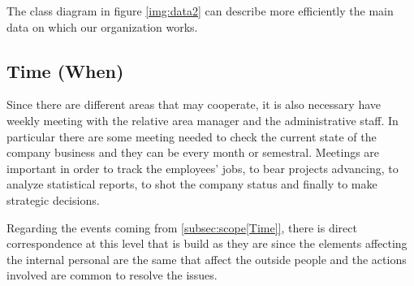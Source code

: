 The class diagram in figure \ref{img:data2} can describe more efficiently  
the main data on which our organization works.





\subsection{Time (When)}
\label{subsec:enterprise[Time]}
Since there are different areas that may cooperate, it is also necessary have weekly meeting with the relative area manager and the administrative staff. In particular there are some meeting needed to check the current state of the company business and they can be every month or semestral. Meetings are important in order to track the employees' jobs, to bear projects advancing, to analyze statistical reports, to shot the company status and finally to make strategic decisions.

Regarding the events coming from \ref{subsec:scope[Time]}, there is direct correspondence at this level that is build as they are since the elements affecting the internal personal are the same that affect the outside people and the actions involved are common to resolve the issues.


